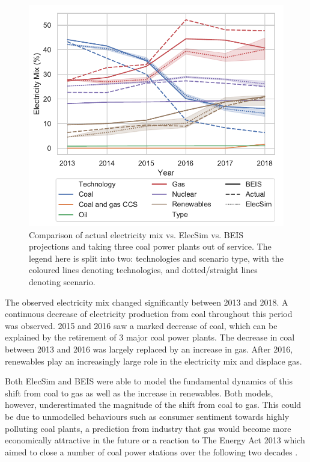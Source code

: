 \begin{figure}
	\centering
	\includegraphics[width=0.7\columnwidth]{Chapter4/figures/e-Energy-2020/results/throughout_years_beis_elecsim_comparison_coal_dropout_leg_below.pdf}
	\caption{Comparison of actual electricity mix vs. ElecSim vs. BEIS projections and taking three coal power plants out of service. The legend here is split into two: technologies and scenario type, with the coloured lines denoting technologies, and dotted/straight lines denoting scenario.}
	\label{elecsim:fig:beis_elecsim_historic_comparison}
\end{figure}

The observed electricity mix changed significantly between 2013 and 2018. A continuous decrease of electricity production from coal throughout this period was observed. 2015 and 2016 saw a marked decrease of coal, which can be explained by the retirement of 3 major coal power plants. The decrease in coal between 2013 and 2016 was largely replaced by an increase in gas. After 2016, renewables play an increasingly large role in the electricity mix and displace gas.

Both ElecSim and BEIS were able to model the fundamental dynamics of this shift from coal to gas as well as the increase in renewables. Both models, however, underestimated the magnitude of the shift from coal to gas. This could be due to unmodelled behaviours such as consumer sentiment towards highly polluting coal plants, a prediction from industry that gas would become more economically attractive in the future or a reaction to The Energy Act 2013 which aimed to close a number of coal power stations over the following two decades \cite{uk_energy_act}.


